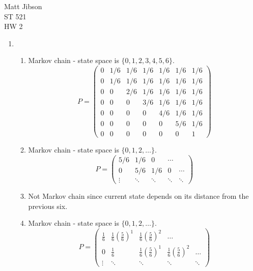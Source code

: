 \documentclass{article}
\begin{document}
\begin{flushright}
Matt Jibson \\
ST 521 \\
HW 2
\end{flushright}

\begin{enumerate}
\item %
	\begin{enumerate}
		\item Markov chain - state space is $\{0, 1, 2, 3, 4, 5, 6\}$.
			\begin{displaymath}
				P = \left( \begin{array}{ccccccc}
					0 & 1/6 & 1/6 & 1/6 & 1/6 & 1/6 & 1/6 \\
					0 & 1/6 & 1/6 & 1/6 & 1/6 & 1/6 & 1/6 \\
					0 & 0 & 2/6 & 1/6 & 1/6 & 1/6 & 1/6 \\
					0 & 0 & 0 & 3/6 & 1/6 & 1/6 & 1/6 \\
					0 & 0 & 0 & 0 & 4/6 & 1/6 & 1/6 \\
					0 & 0 & 0 & 0 & 0 & 5/6 & 1/6 \\
					0 & 0 & 0 & 0 & 0 & 0 & 1
				\end{array} \right)
			\end{displaymath}
		\item Markov chain - state space is $\{0, 1, 2, \dots\}$.
			\begin{displaymath}
				P = \left( \begin{array}{ccccc}
					5/6 & 1/6 & 0 & \cdots \\
					0 & 5/6 & 1/6 & 0 & \cdots \\
					\vdots & \ddots & \ddots & \ddots & \ddots
				\end{array} \right)
			\end{displaymath}
		\item Not Markov chain since current state depends on its distance from the previous six.
		\item Markov chain - state space is $\{0, 1, 2, \dots\}$.
			\begin{displaymath}
				P = \left( \begin{array}{ccccc}
					\frac{1}{6} & \frac{1}{6} (\frac{5}{6})^1 & \frac{1}{6} (\frac{5}{6})^2 & \dots \\
					0 & \frac{1}{6} & \frac{1}{6} (\frac{5}{6})^1 & \frac{1}{6} (\frac{5}{6})^2 & \dots \\
					\vdots & \ddots & \ddots & \ddots & \ddots
				\end{array} \right)

\end{displaymath}
\end{enumerate}
\end{enumerate}
\end{document}
